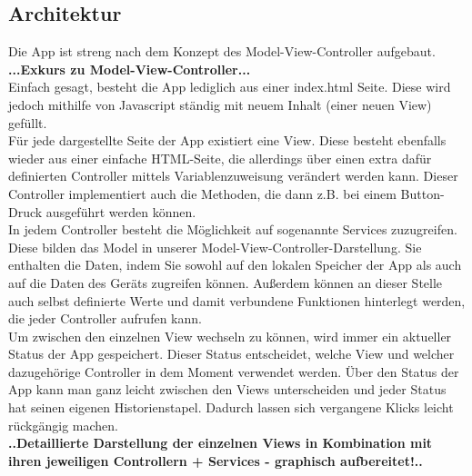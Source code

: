 \subsection{Architektur}
Die App ist streng nach dem Konzept des Model-View-Controller aufgebaut.
\\
\textbf{...Exkurs zu Model-View-Controller...
}\\
Einfach gesagt, besteht die App lediglich aus einer index.html Seite. Diese wird jedoch mithilfe von Javascript ständig mit neuem Inhalt (einer neuen View) gefüllt.
\\
Für jede dargestellte Seite der App existiert eine View. Diese besteht ebenfalls wieder aus einer einfache HTML-Seite, die allerdings über einen extra dafür definierten Controller mittels Variablenzuweisung verändert werden kann. Dieser Controller implementiert auch die Methoden, die dann z.B. bei einem Button-Druck ausgeführt werden können.
\\
In jedem Controller besteht die Möglichkeit auf sogenannte Services zuzugreifen. Diese bilden das Model in unserer Model-View-Controller-Darstellung. Sie enthalten die Daten, indem Sie sowohl auf den lokalen Speicher der App als auch auf die Daten des Geräts zugreifen können. Außerdem können an dieser Stelle auch selbst definierte Werte und damit verbundene Funktionen hinterlegt werden, die jeder Controller aufrufen kann.
\\
Um zwischen den einzelnen View wechseln zu können, wird immer ein aktueller Status der App gespeichert. Dieser Status entscheidet, welche View und welcher dazugehörige Controller in dem Moment verwendet werden. Über den Status der App kann man ganz leicht zwischen den Views unterscheiden und jeder Status hat seinen eigenen Historienstapel. Dadurch lassen sich vergangene Klicks leicht rückgängig machen.
\\
\textbf{..Detaillierte Darstellung der einzelnen Views in Kombination mit ihren jeweiligen Controllern + Services - graphisch aufbereitet!..}